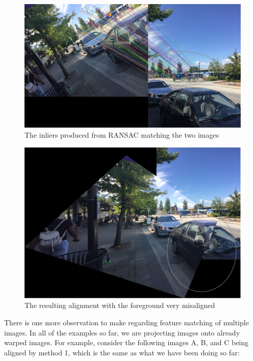 \documentclass[]{article}
\begin{document}
\begin{figure}[!h]
	\includegraphics[scale=0.5]{results/issue1}
	\centering
	\caption{The inliers produced from RANSAC matching the two images }
\end{figure}
\begin{figure}[!h]
	\includegraphics[scale=0.6]{results/issue2}
	\centering
	\caption{The resulting alignment with the foreground very misaligned}
\end{figure}
\vspace{10mm}

There is one more observation to make regarding feature matching of multiple images. In all of the examples so far, we are projecting images onto already warped images. For example, consider the following images A, B, and C being aligned by method 1, which is the same as what we have been doing so far:
\end{document}
